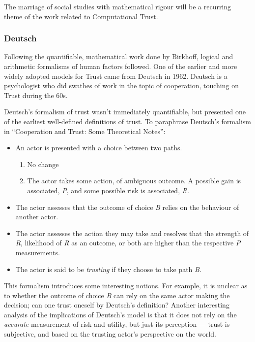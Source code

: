 The marriage of social studies with mathematical rigour will be a recurring theme of the work related to Computational Trust.\par

\subsubsection{Deutsch}
Following the quantifiable, mathematical work done by Birkhoff, logical and arithmetic formalisms of human factors followed. One of the earlier and more widely adopted models for Trust came from Deutsch in 1962. 
Deutsch is a psychologist who did swathes of work in the topic of cooperation, touching on Trust during the 60s. \par

Deutsch's formalism of trust wasn't immediately quantifiable, but presented one of the earliest well-defined definitions of trust. To paraphrase Deutsch's formalism in ``Cooperation and Trust: Some Theoretical Notes''\cite{deutsch1962cooperation}:
\begin{itemize}
    \item An actor is presented with a choice between two paths.
    \begin{enumerate}[label=\emph{\Alph*}:]
        \item No change
        \item The actor takes some action, of ambiguous outcome. A possible gain is associated, \emph{P}, and some possible risk is associated, \emph{R}.
    \end{enumerate}
    \item The actor assesses that the outcome of choice \emph{B} relies on the behaviour of another actor.
    \item The actor assesses the action they may take and resolves that the strength of \emph{R}, likelihood of \emph{R} as an outcome, or both are higher than the respective \emph{P} measurements.
    \item The actor is said to be \emph{trusting} if they choose to take path \emph{B}.
\end{itemize}

This formalism introduces some interesting notions. For example, it is unclear as to whether the outcome of choice \emph{B} can rely on the same actor making the decision; can one trust oneself by Deutsch's definition? Another interesting analysis of the implications of Deutsch's model is that it does not rely on the \emph{accurate} measurement of risk and utility, but just its perception --- trust is subjective, and based on the trusting actor's perspective on the world.


